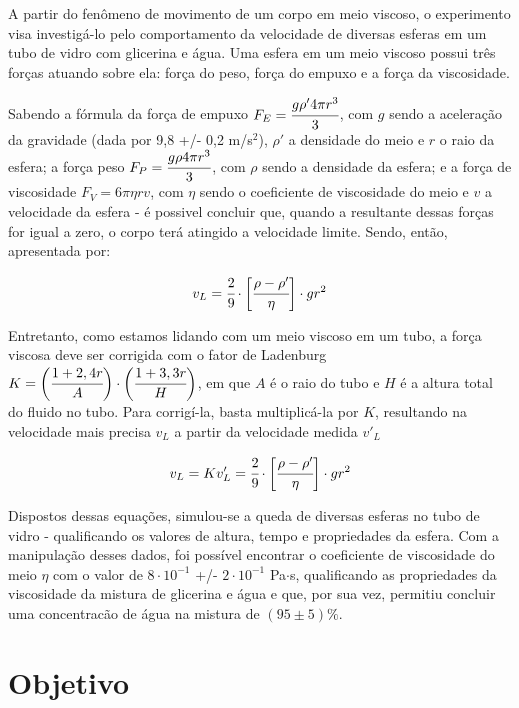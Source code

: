 \documentclass[english,brazil]{article}
\begin{document}
	A partir do fenômeno de movimento de um corpo em meio viscoso, o experimento visa investigá-lo pelo comportamento da velocidade de diversas esferas em um tubo de vidro com glicerina e água. Uma esfera em um meio viscoso possui três forças atuando sobre ela: força do peso, força do empuxo e a força da viscosidade. 

Sabendo a fórmula da força de empuxo $F_E = \cfrac{g \rho ' 4 \pi r^3}{3}$, com $g$ sendo a aceleração da gravidade (dada por 9,8 +/- 0,2 m/s$^2$), $\rho '$ a densidade do meio e $r$ o raio da esfera; a força peso $F_P =  \cfrac{g \rho 4 \pi r^3}{3}$, com $\rho$ sendo a densidade da esfera; e a força de viscosidade $F_V = 6\pi \eta r v$, com $\eta$ sendo o coeficiente de viscosidade do meio e $v$ a velocidade da esfera - é possivel concluir que, quando a resultante dessas forças for igual a zero, o corpo terá atingido a velocidade limite. Sendo, então, apresentada por:

\begin{equation}
	v_L = \cfrac{2}{9} \cdot \bigg[\cfrac{\rho - \rho '}{\eta}\bigg] \cdot g r^2
\end{equation}

Entretanto, como estamos lidando com um meio viscoso em um tubo, a força viscosa deve ser corrigida com o fator de Ladenburg $K = \bigg(\cfrac{1 + 2,4r}{A}\bigg) \cdot \bigg(\cfrac{1 + 3,3r}{H}\bigg)$, em que $A$ é o raio do tubo e $H$ é a altura total do fluido no tubo. Para corrigí-la, basta multiplicá-la por $K$, resultando na velocidade mais precisa $v_L$ a partir da velocidade medida $v'_L$

\begin{equation}
	v_L = K v_L ' = \cfrac{2}{9} \cdot \bigg[\cfrac{\rho - \rho '}{\eta}\bigg] \cdot g r^2
\end{equation}

Dispostos dessas equações, simulou-se a queda de diversas esferas no tubo de vidro - qualificando os valores de altura, tempo e propriedades da esfera. Com a manipulação desses dados, foi possível encontrar o coeficiente de viscosidade do meio $\eta$ com o valor de $8 \cdot 10^{-1}$ +/- $2 \cdot 10^{-1}$ Pa$\cdot$s, qualificando as propriedades da viscosidade da mistura de glicerina e água e que, por sua vez, permitiu concluir uma concentracão de água na mistura de $(95\pm5)\%$.

\section{Objetivo}
\end{document}
